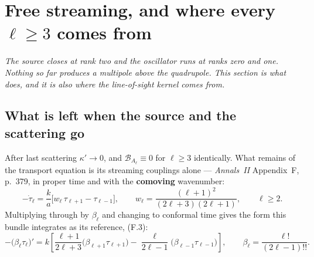 %
%
\section{Free streaming, and where every $\ell\ge3$ comes from}
\label{sec:free-streaming}

\emph{The source closes at rank two and the oscillator runs at ranks zero and
one. Nothing so far produces a multipole above the quadrupole. This section is
what does, and it is also where the line-of-sight kernel comes from.}

\subsection{What is left when the source and the scattering go}

After last scattering $\kappa'\to0$, and $\mathcal B_{A_\ell}\equiv0$ for
$\ell\ge3$ identically. What remains of the transport equation is its
streaming couplings alone --- \emph{Annals~II} Appendix~F, p.~379, in proper
time and with the \textbf{comoving} wavenumber:
\begin{equation}
  -\dot\tau_\ell=\frac{k}{a}\Big[w_\ell\,\tau_{\ell+1}-\tau_{\ell-1}\Big],
  \qquad
  w_\ell=\frac{(\ell+1)^2}{(2\ell+3)(2\ell+1)},
  \qquad \ell\ge2 .
  \label{eq:F1}
\end{equation}
Multiplying through by $\beta_\ell$ and changing to conformal time gives the
form this bundle integrates as its reference, (F.3):
\begin{equation}
  -\big(\beta_\ell\tau_\ell\big)'
  =k\left[\frac{\ell+1}{2\ell+3}\big(\beta_{\ell+1}\tau_{\ell+1}\big)
         -\frac{\ell}{2\ell-1}\big(\beta_{\ell-1}\tau_{\ell-1}\big)\right],
  \qquad \beta_\ell=\frac{\ell!}{(2\ell-1)!!} .
  \label{eq:F3}
\end{equation}

